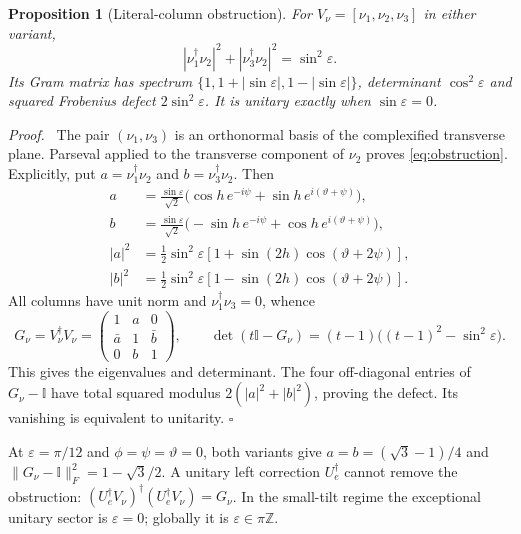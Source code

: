 \documentclass[11pt,a4paper]{article}
\numberwithin{equation}{section}
\newtheorem{proposition}{Proposition}[section]
\newenvironment{proof}{\par\noindent\textit{Proof.}\ }{\hfill$\square$\par}
\newcommand{\I}{\mathbb I}\newcommand{\Argz}{\operatorname{Arg}_0}
\begin{document}
\begin{proposition}[Literal-column obstruction]\label{prop:gram}
For $V_\nu=[\nu_1,\nu_2,\nu_3]$ in either variant,
\begin{equation}\label{eq:obstruction}
 |\nu_1^\dagger\nu_2|^2+|\nu_3^\dagger\nu_2|^2=\sin^2\varepsilon.
\end{equation}
Its Gram matrix has spectrum $\{1,1+|\sin\varepsilon|,1-|\sin\varepsilon|\}$, determinant $\cos^2\varepsilon$ and squared Frobenius defect $2\sin^2\varepsilon$. It is unitary exactly when $\sin\varepsilon=0$.
\end{proposition}
\begin{proof}
The pair $(\nu_1,\nu_3)$ is an orthonormal basis of the complexified transverse plane. Parseval applied to the transverse component of $\nu_2$ proves \eqref{eq:obstruction}. Explicitly, put $a=\nu_1^\dagger\nu_2$ and $b=\nu_3^\dagger\nu_2$. Then
\begin{align}
 a&=\frac{\sin\varepsilon}{\sqrt2}\bigl(\cos h\,e^{-i\psi}+\sin h\,e^{i(\vartheta+\psi)}\bigr),\nonumber\\
 b&=\frac{\sin\varepsilon}{\sqrt2}\bigl(-\sin h\,e^{-i\psi}+\cos h\,e^{i(\vartheta+\psi)}\bigr),\label{eq:overlaps}\\
 |a|^2&=\tfrac12\sin^2\varepsilon[1+\sin(2h)\cos(\vartheta+2\psi)],\nonumber\\
 |b|^2&=\tfrac12\sin^2\varepsilon[1-\sin(2h)\cos(\vartheta+2\psi)].\nonumber
\end{align}
All columns have unit norm and $\nu_1^\dagger\nu_3=0$, whence
\begin{equation}\label{eq:gram}
 G_\nu=V_\nu^\dagger V_\nu=\begin{pmatrix}1&a&0\\\bar a&1&\bar b\\0&b&1\end{pmatrix},\qquad
 \det(t\I-G_\nu)=(t-1)\bigl((t-1)^2-\sin^2\varepsilon\bigr).
\end{equation}
This gives the eigenvalues and determinant. The four off-diagonal entries of $G_\nu-\I$ have total squared modulus $2(|a|^2+|b|^2)$, proving the defect. Its vanishing is equivalent to unitarity.
\end{proof}
At $\varepsilon=\pi/12$ and $\phi=\psi=\vartheta=0$, both variants give $a=b=(\sqrt3-1)/4$ and $\|G_\nu-\I\|_F^2=1-\sqrt3/2$. A unitary left correction $U_e^\dagger$ cannot remove the obstruction: $(U_e^\dagger V_\nu)^\dagger(U_e^\dagger V_\nu)=G_\nu$. In the small-tilt regime the exceptional unitary sector is $\varepsilon=0$; globally it is $\varepsilon\in\pi\mathbb Z$.
\end{document}

